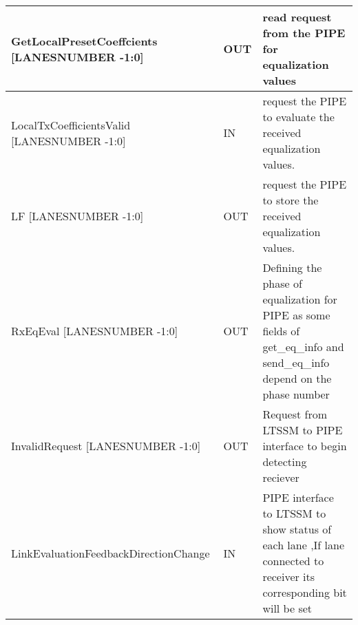 \begin{table}[H]
\begin{tabular}{ |P{60mm}|P{10mm}|m{60mm}|  }
GetLocalPresetCoeffcients [LANESNUMBER -1:0] & OUT & read request from the PIPE for equalization values \\ \hline

LocalTxCoefficientsValid [LANESNUMBER -1:0] & IN & request the PIPE to evaluate the received equalization values. \\ \hline

LF [LANESNUMBER -1:0] & OUT & request the PIPE to store the received equalization values. \\ \hline

RxEqEval [LANESNUMBER -1:0] & OUT & Defining the phase of equalization for PIPE as some fields of get\_eq\_info and send\_eq\_info  depend on the phase number \\
\hline



InvalidRequest [LANESNUMBER -1:0] & OUT & Request from LTSSM to PIPE interface to begin detecting reciever  \\ \hline

LinkEvaluationFeedbackDirectionChange \newline  [6*LANESNUMBER -1:0]  & IN & PIPE interface to LTSSM to show status of each lane ,If lane connected to receiver its corresponding bit will be set \\ \hline 

\end{tabular}
\end{table}


